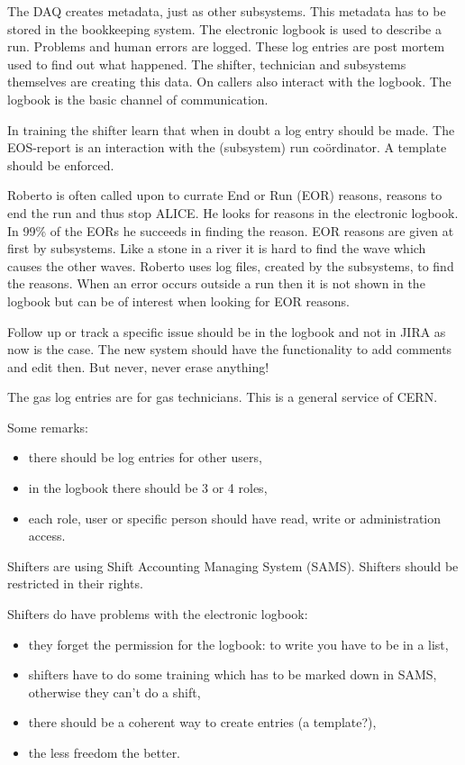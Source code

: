 The DAQ creates metadata, just as other subsystems. This metadata has to be stored in the bookkeeping system. The electronic logbook is used to describe a run. Problems and human errors are logged. These log entries are post mortem used to find out what happened. The shifter, technician and subsystems themselves are creating this data. On callers also interact with the logbook. The logbook is the basic channel of communication.

In training the shifter learn that when in doubt a log entry should be made. The EOS-report is an interaction with the (subsystem) run co\"ordinator. A template should be enforced. 

Roberto is often called upon to currate End or Run (EOR) reasons, reasons to end the run and thus stop ALICE. He looks for reasons in the electronic logbook. In 99\% of the EORs he succeeds in finding the reason. EOR reasons are given at first by subsystems. Like a stone in a river it is hard to find the wave which causes the other waves. Roberto uses log files, created by the subsystems, to find the reasons. When an error occurs outside a run then it is not shown in the logbook but can be of interest when looking for EOR reasons. 

Follow up or track a specific issue should be in the logbook and not in JIRA as now is the case. The new system should have the functionality to add comments and edit then. But never, never erase anything!

The gas log entries are for gas technicians. This is a general service of CERN.

Some remarks:
\begin{itemize}
  \item there should be log entries for other users,
  \item in the logbook there should be 3 or 4 roles,
  \item each role, user or specific person should have read, write or administration access.
\end{itemize}

Shifters are using Shift Accounting Managing System (SAMS). Shifters should be restricted in their rights. 

Shifters do have problems with the electronic logbook:
\begin{itemize}
  \item they forget the permission for the logbook: to write you have to be in a list,
  \item shifters have to do some training which has to be marked down in SAMS, otherwise they can't do a shift,
  \item there should be a coherent way to create entries (a template?),
  \item the less freedom the better.
\end{itemize}


